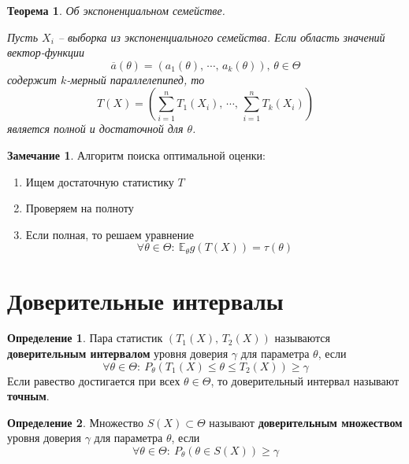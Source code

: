 \documentclass[a4paper,12pt]{article}
\renewcommand{\leq}{\ensuremath{\leqslant}}
\renewcommand{\geq}{\ensuremath{\geqslant}}
\theoremstyle{plain}
\newtheorem{theorem}{Теорема}[section]
\theoremstyle{definition}
\newtheorem{definition}{Определение}[section]
\newtheorem*{note}{Замечание}
\theoremstyle{remark}
\begin{document}
\begin{theorem}
  Об экспоненциальном семействе.

  Пусть $X_i$ -- выборка из экспоненциального семейства. Если область значений вектор-функции 
  \[
    \overline{a}(\theta) = (a_1(\theta),\,\cdots,\,a_k(\theta)),\, \theta \in \Theta
  \]
  содержит $k$-мерный параллелепипед, то
  \[
    T(X) = \left(\sum_{i = 1}^nT_1(X_i),\,\cdots,\,\sum_{i = 1}^nT_k(X_i)\right)
  \]
  является полной и достаточной для $\theta$.
\end{theorem}

\begin{note}
  Алгоритм поиска оптимальной оценки:
  \begin{enumerate}
    \item Ищем достаточную статистику $T$
    \item Проверяем на полноту
    \item Если полная, то решаем уравнение 
    \[
      \forall \theta \in \Theta :\: \mathbb{E}_\theta g(T(X)) = \tau(\theta)
    \]
  \end{enumerate}
\end{note}

\section{Доверительные интервалы}
\begin{definition}
    Пара статистик $(T_1(X),\,T_2(X))$ называются \textbf{доверительным интервалом} уровня доверия $\gamma$ для параметра $\theta$, если 
    \[
      \forall \theta \in \Theta :\: P_\theta(T_1(X) \leq \theta \leq T_2(X)) \geq \gamma
    \]
    Если равество достигается при всех $\theta \in \Theta$, то доверительный интервал называют \textbf{точным}.
\end{definition}

\begin{definition}
  Множество $S(X) \subset \Theta$ называют \textbf{доверительным множеством} уровня доверия $\gamma$ для параметра $\theta$, если
  \[
    \forall \theta \in \Theta :\: P_\theta(\theta \in S(X)) \geq \gamma
  \]
\end{definition}
\end{document}
